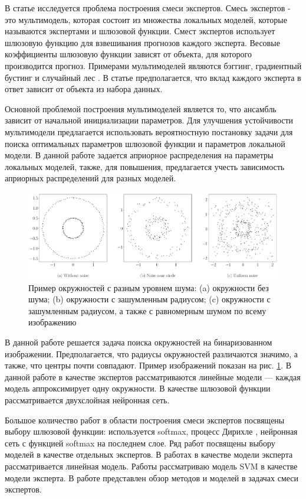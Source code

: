 В статье исследуется проблема построения смеси экспертов.
Смесь экспертов - это мультимодель, которая состоит из множества локальных моделей, которые называются экспертами и шлюзовой функции.
Смест экспертов использует шлюзовую функцию для взвешивания прогнозов каждого эксперта.
Весовые коэффициенты шлюзовую функции зависят от объекта, для которого производится прогноз.
Примерами мультимоделей являются бэггинг,  градиентный бустинг \cite{Tianqi2016} и случайный лес \cite{Ishwaran2012}.
В статье \cite{Yuksel2012} предполагается, что вклад каждого эксперта в ответ зависит от объекта из набора данных.

Основной проблемой построения мультимоделей является то, что ансамбль зависит от начальной инициализации параметров. Для улучшения устойчивости мультимодели предлагается использовать вероятностную постановку задачи для поиска оптимальных параметров шлюзовой функции и параметров локальной модели. В данной работе задается априорное распределения на параметры локальных моделей, также, для повышения, предлагается учесть зависимость априорных распределений для разных моделей.

\begin{figure}[h!t]\center
\includegraphics[width=1\textwidth]{results/priorexpert/statment}
\caption{Пример окружностей с разным уровнем шума: (a) окружности без шума; (b) окружности с зашумленным радиусом; (c) окружности с зашумленным радиусом, а также с равномерным шумом по всему изображению}
\label{example:1}
\end{figure}

В данной работе решается задача поиска окружностей на бинаризованном изображении. Предполагается, что радиусы окружностей различаются значимо, а также, что центры почти совпадают. Пример изображений показан на рис. \ref{example:1}. В данной работе в качестве экспертов рассматриваются линейные модели --- каждая модель аппроксимирует одну окружности. В качестве шлюзовой функции рассматривается двухслойная нейронная сеть.

Большое количество работ в области построения смеси экспертов посвящены выбору шлюзовой функции: используется softmax, процесс Дирихле \cite{Edward2002}, нейронная сеть \cite{Shazeer2017} с функцией softmax на последнем слое. Ряд работ посвящены выбору моделей в качестве отдельных экспертов. В работах \cite{Jordan1994, Jordan1991} в качестве модели эксперта рассматривается линейная модель. Работы \cite{Lima2007, Cao2003} рассматриваю модель SVM в качестве модели эксперта.
В работе \cite{Yuksel2012} представлен обзор методов и моделей в задачах смеси экспертов.

